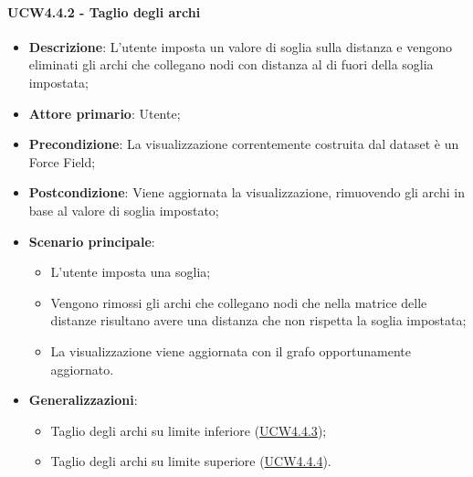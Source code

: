 \paragraph{UCW4.4.2 - Taglio degli archi}
\label{par:ucw4.4.2}
\begin{itemize}
    \item \textbf{Descrizione}:     L'utente imposta un valore di soglia sulla distanza e vengono eliminati gli archi che collegano nodi con distanza al di fuori della soglia impostata;
    \item \textbf{Attore primario}: Utente;
    \item \textbf{Precondizione}:   La visualizzazione correntemente costruita dal dataset è un Force Field;
    \item \textbf{Postcondizione}:  Viene aggiornata la visualizzazione, rimuovendo gli archi in base al valore di soglia impostato;
    \item \textbf{Scenario principale}:
    \begin{itemize}
        \item L'utente imposta una soglia;
        \item Vengono rimossi gli archi che collegano nodi che nella matrice delle distanze risultano avere una distanza che non rispetta la soglia impostata;
        \item La visualizzazione viene aggiornata con il grafo opportunamente aggiornato.
    \end{itemize}

    \item \textbf{Generalizzazioni}:
    \begin{itemize}
        \item Taglio degli archi su limite inferiore (\hyperref[par:ucw4.4.3]{UCW4.4.3});
        \item Taglio degli archi su limite superiore (\hyperref[par:ucw4.4.4]{UCW4.4.4}).
    \end{itemize}
\end{itemize}


